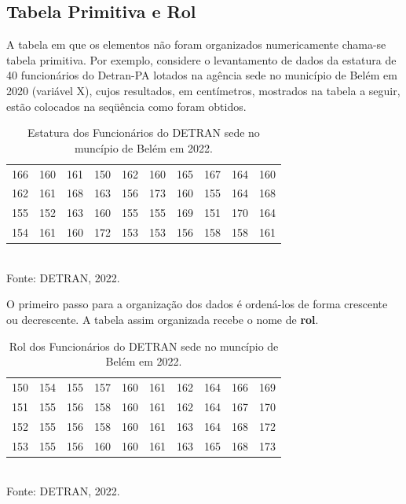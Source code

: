 \subsection{Tabela Primitiva e Rol}


\inic A tabela em que os elementos não foram organizados numericamente chama-se tabela primitiva. Por exemplo, considere o levantamento de dados da estatura de 40 funcionários do Detran-PA lotados na agência sede no município de Belém em 2020 (variável X), cujos resultados, em centímetros, mostrados na tabela a seguir, estão colocados na seqüência como foram obtidos.


\begin{table}[!htb]
    \centering
    {
    \caption{Estatura dos Funcionários do DETRAN sede no muncípio de Belém em 2022.}
    \label{estatura}
    \vspace{0.2cm}
\begin{tabular}{c|c|c|c|c|c|c|c|c|c}
  \hline\hline
  166 & 160 & 161 & 150 & 162 & 160 & 165 & 167 & 164 & 160 \\
  162 & 161 & 168 & 163 & 156 & 173 & 160 & 155 & 164 & 168 \\
  155 & 152 & 163 & 160 & 155 & 155 & 169 & 151 & 170 & 164 \\
  154 & 161 & 160 & 172 & 153 & 153 & 156 & 158 & 158 & 161 \\
  \hline\hline
\end{tabular}}
\\
\hspace{-5.5cm} Fonte: DETRAN, 2022.
\end{table}

\newpage

O primeiro passo para a organização dos dados é ordená-los de forma crescente ou decrescente. A tabela assim organizada recebe o nome de \textbf{rol}.


\begin{table}[!htb]
    \centering
    {
    \caption{Rol dos Funcionários do DETRAN sede no muncípio de Belém em 2022.}
    \label{estatura2}
    \vspace{0.2cm}
\begin{tabular}{c|c|c|c|c|c|c|c|c|c}
  \hline\hline
  150 & 154 & 155 & 157 & 160 & 161 & 162 & 164 & 166 & 169 \\
  151 & 155 & 156 & 158 & 160 & 161 & 162 & 164 & 167 & 170 \\
  152 & 155 & 156 & 158 & 160 & 161 & 163 & 164 & 168 & 172 \\
  153 & 155 & 156 & 160 & 160 & 161 & 163 & 165 & 168 & 173 \\
  \hline\hline
\end{tabular}}
\\
\hspace{-6.5cm} Fonte: DETRAN, 2022.
\end{table}




